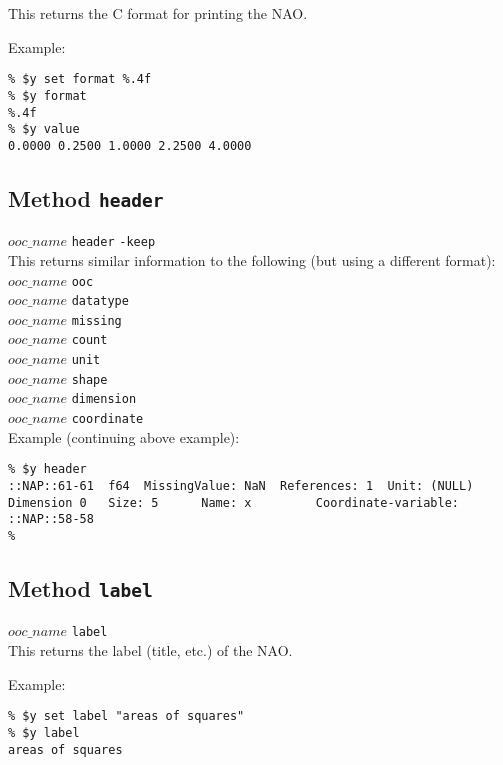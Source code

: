 This returns the C format for printing the NAO.
  

Example:
  \begin{verbatim}
% $y set format %.4f
% $y format
%.4f
% $y value
0.0000 0.2500 1.0000 2.2500 4.0000
\end{verbatim}

  \subsection{
    \label{header}Method \texttt{header}
  }

  


  $ooc\_name$ 
  \texttt{header} 
  \texttt{-keep}
  \\
  

This returns similar information to the following (but using a
  different format):
  \\
  $ooc\_name$ 
  \texttt{ooc}
  \\
  $ooc\_name$ 
  \texttt{datatype}
  \\
  $ooc\_name$ 
  \texttt{missing}
  \\
  $ooc\_name$ 
  \texttt{count}
  \\
  $ooc\_name$ 
  \texttt{unit}
  \\
  $ooc\_name$ 
  \texttt{shape}
  \\
  $ooc\_name$ 
  \texttt{dimension}
  \\
  $ooc\_name$ 
  \texttt{coordinate}
  \\
  

Example (continuing above example):
  \begin{verbatim}
% $y header
::NAP::61-61  f64  MissingValue: NaN  References: 1  Unit: (NULL)
Dimension 0   Size: 5      Name: x         Coordinate-variable:
::NAP::58-58
% 
\end{verbatim}

  \subsection{
    \label{label}Method \texttt{label}
  }

  


  $ooc\_name$ 
  \texttt{label}
  \\
  

This returns the label (title, etc.) of the NAO.
  

Example:
  \begin{verbatim}
% $y set label "areas of squares"
% $y label
areas of squares
\end{verbatim}

